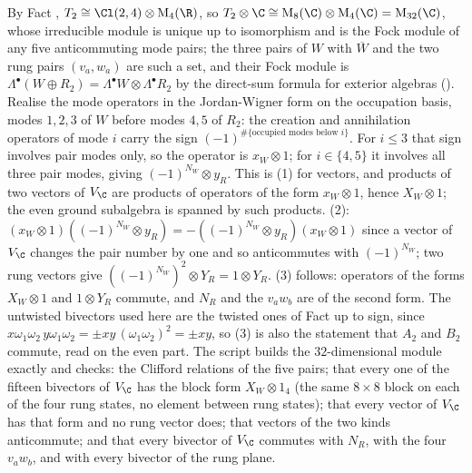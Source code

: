 By Fact , $T_{2} \cong \Cl(2,4) \otimes \mathrm{M}_{4}(\R)$, so $T_{2} \otimes \C \cong \mathrm{M}_{8}(\C) \otimes \mathrm{M}_{4}(\C) = \mathrm{M}_{32}(\C)$, whose irreducible module is unique up to isomorphism and is the Fock module of any five anticommuting mode pairs; the three pairs of $W$ with $\overline{W}$ and the two rung pairs $(v_{a}, w_{a})$ are such a set, and their Fock module is $\Lambda^{\bullet}(W \oplus R_{2}) = \Lambda^{\bullet}W \otimes \Lambda^{\bullet}R_{2}$ by the direct-sum formula for exterior algebras \cite[App.~B.2]{FultonHarris1991} (). Realise the mode operators in the Jordan-Wigner form on the occupation basis, modes $1, 2, 3$ of $W$ before modes $4, 5$ of $R_{2}$: the creation and annihilation operators of mode $i$ carry the sign $(-1)^{\#\{\text{occupied modes below } i\}}$. For $i \le 3$ that sign involves pair modes only, so the operator is $x_{W} \otimes 1$; for $i \in \{4, 5\}$ it involves all three pair modes, giving $(-1)^{N_{W}} \otimes y_{R}$. This is (1) for vectors, and products of two vectors of $V_{\C}$ are products of operators of the form $x_{W} \otimes 1$, hence $X_{W} \otimes 1$; the even ground subalgebra is spanned by such products. (2): $(x_{W} \otimes 1)((-1)^{N_{W}} \otimes y_{R}) = -((-1)^{N_{W}} \otimes y_{R})(x_{W} \otimes 1)$ since a vector of $V_{\C}$ changes the pair number by one and so anticommutes with $(-1)^{N_{W}}$; two rung vectors give $((-1)^{N_{W}})^{2} \otimes Y_{R} = 1 \otimes Y_{R}$. (3) follows: operators of the forms $X_{W} \otimes 1$ and $1 \otimes Y_{R}$ commute, and $N_{R}$ and the $v_{a}w_{b}$ are of the second form. The untwisted bivectors used here are the twisted ones of Fact  up to sign, since $x\omega_{1}\omega_{2}\,y\omega_{1}\omega_{2} = \pm xy\,(\omega_{1}\omega_{2})^{2} = \pm xy$, so (3) is also the statement that $A_{2}$ and $B_{2}$ commute, read on the even part. The script builds the $32$-dimensional module exactly and checks: the Clifford relations of the five pairs; that every one of the fifteen bivectors of $V_{\C}$ has the block form $X_{W} \otimes 1_{4}$ (the same $8 \times 8$ block on each of the four rung states, no element between rung states); that every vector of $V_{\C}$ has that form and no rung vector does; that vectors of the two kinds anticommute; and that every bivector of $V_{\C}$ commutes with $N_{R}$, with the four $v_{a}w_{b}$, and with every bivector of the rung plane.
